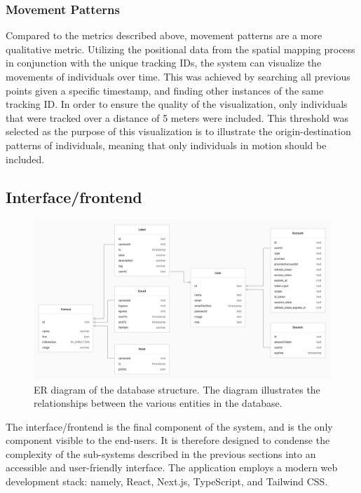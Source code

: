 \subsubsection{Movement Patterns}

Compared to the metrics described above, movement patterns are a more qualitative metric. Utilizing the positional data from the spatial mapping process in conjunction with the unique tracking IDs, the system can visualize the movements of individuals over time. This was achieved by searching all previous points given a specific timestamp, and finding other instances of the same tracking ID. In order to ensure the quality of the visualization, only individuals that were tracked over a distance of 5 meters were included. This threshold was selected as the purpose of this visualization is to illustrate the origin-destination patterns of individuals, meaning that only individuals in motion should be included.

\subsection{Interface/frontend}
\label{sec:frontend}

\begin{figure}[hpbt!]
  \centering
  \includegraphics[width=\textwidth]{Pictures/Figures/er_diagram.png}
  \caption{ER diagram of the database structure. The diagram illustrates the relationships between the various entities in the database.}
  \label{fig:er_diagram}
\end{figure}


The interface/frontend is the final component of the system, and is the only component visible to the end-users. It is therefore designed to condense the complexity of the sub-systems described in the previous sections into an accessible and user-friendly interface. The application employs a modern web development stack: namely, React, Next.js, TypeScript, and Tailwind CSS.

